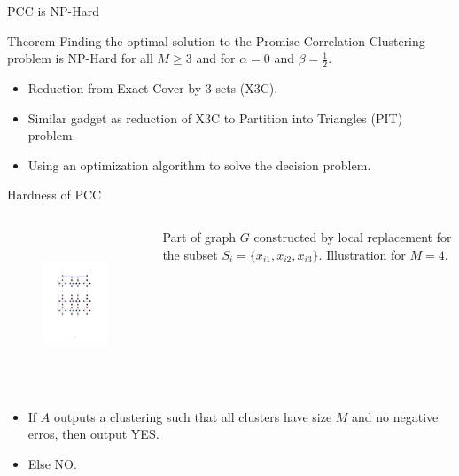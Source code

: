 \documentclass{beamer}
\begin{document}
\begin{frame}{PCC is NP-Hard}
	\begin{block}{Theorem}
		Finding the optimal solution to the Promise Correlation Clustering problem is NP-Hard for all $M \ge 3$ and for $\alpha = 0$ and $\beta = \frac{1}{2}$.  
	\end{block}
	
	\vspace{20pt}
	\begin{itemize}
		\item Reduction from Exact Cover by $3$-sets (X3C).\\
		\vspace{10pt}\item Similar gadget as reduction of X3C to Partition into Triangles (PIT) problem.
		\vspace{10pt}\item Using an optimization algorithm to solve the decision problem.  

	\end{itemize}
\end{frame}

\begin{frame}{Hardness of PCC}
	\begin{columns}
		\begin{column}{0.48\textwidth}
			\vspace{-40pt}\begin{figure}
				\centering
				\includegraphics[trim = 100 290 100 100, clip, width=6cm, height=4.5cm]{figures/deDuplication/pccHard.pdf}
			\end{figure}
		\end{column}

		\begin{column}{0.48\textwidth}
		    Part of graph $G$ constructed by local replacement for the subset $S_i =  \{x_{i1}, x_{i2}, x_{i3}\}$. Illustration for $M = 4$.
		\end{column}
	\end{columns}

	
	\vspace{20pt}\begin{itemize}
		\item If $A$ outputs a clustering such that all clusters have size $M$ and no negative erros, then output YES.
		\vspace{10pt}\item Else NO.
	\end{itemize}
\end{frame}
\end{document}
